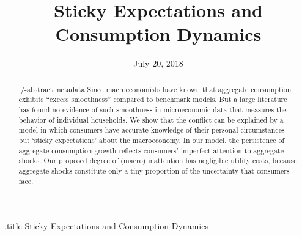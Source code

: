 \documentclass[titlepage]{\econtex}\newcommand{\texname}{cAndCwithStickyE}
\begin{document}




\begin{verbatimwrite}{\jobname.title}
Sticky Expectations and Consumption Dynamics
\end{verbatimwrite}

\hfill{\tiny \jobname}

\title{Sticky Expectations and \\ Consumption Dynamics}




\date{July 20, 2018}
\maketitle

\begin{abstract}
  \begin{verbatimwrite}{./\jobname-abstract.metadata}
    Since \cite{cdSmooth} macroeconomists have known that aggregate consumption exhibits ``excess smoothness'' compared to benchmark models.  But a large literature has found no evidence of such smoothness in microeconomic data that measures the behavior of individual households.  We show that the conflict can be explained by a model in which consumers have accurate knowledge of their personal circumstances but `sticky expectations' about the macroeconomy. In our model, the persistence of aggregate consumption growth reflects consumers' imperfect attention to aggregate shocks. Our proposed degree of (macro) inattention has negligible utility costs, because aggregate shocks constitute only a tiny proportion of the uncertainty that consumers face.  %
  \end{verbatimwrite}
  
\end{abstract}
\end{document}

